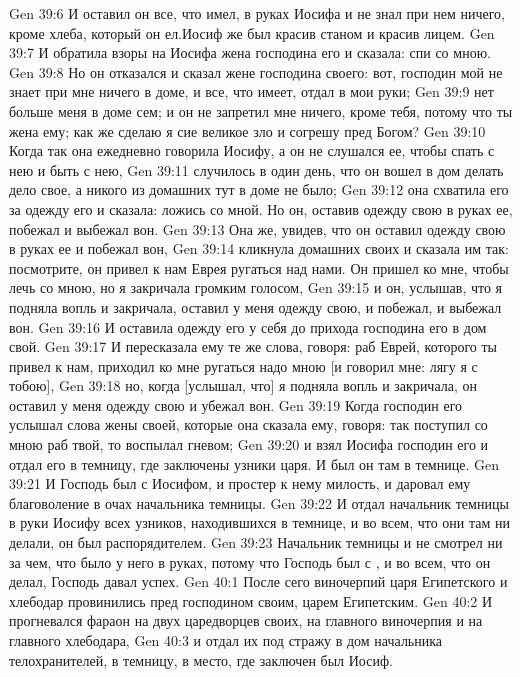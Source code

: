 \vs Gen 39:6 И оставил он все, что имел, в руках Иосифа и не знал при нем ничего, кроме хлеба, который он ел.\rsbpar Иосиф же был красив станом и красив лицем.
\vs Gen 39:7 И обратила взоры на Иосифа жена господина его и сказала: спи со мною.
\vs Gen 39:8 Но он отказался и сказал жене господина своего: вот, господин мой не знает при мне ничего в доме, и все, что имеет, отдал в мои руки;
\vs Gen 39:9 нет больше меня в доме сем; и он не запретил мне ничего, кроме тебя, потому что ты жена ему; как же сделаю я сие великое зло и согрешу пред Богом?
\vs Gen 39:10 Когда так она ежедневно говорила Иосифу, а он не слушался ее, чтобы спать с нею и быть с нею,
\vs Gen 39:11 случилось в один день, что он вошел в дом делать дело свое, а никого из домашних тут в доме не было;
\vs Gen 39:12 она схватила его за одежду его и сказала: ложись со мной. Но он, оставив одежду свою в руках ее, побежал и выбежал вон.
\vs Gen 39:13 Она же, увидев, что он оставил одежду свою в руках ее и побежал вон,
\vs Gen 39:14 кликнула домашних своих и сказала им так: посмотрите, он привел к нам Еврея ругаться над нами. Он пришел ко мне, чтобы лечь со мною, но я закричала громким голосом,
\vs Gen 39:15 и он, услышав, что я подняла вопль и закричала, оставил у меня одежду свою, и побежал, и выбежал вон.
\vs Gen 39:16 И оставила одежду его у себя до прихода господина его в дом свой.
\vs Gen 39:17 И пересказала ему те же слова, говоря: раб Еврей, которого ты привел к нам, приходил ко мне ругаться надо мною [и говорил мне: лягу я с тобою],
\vs Gen 39:18 но, когда [услышал, что] я подняла вопль и закричала, он оставил у меня одежду свою и убежал вон.
\vs Gen 39:19 Когда господин его услышал слова жены своей, которые она сказала ему, говоря: так поступил со мною раб твой, то воспылал гневом;
\vs Gen 39:20 и взял Иосифа господин его и отдал его в темницу, где заключены узники царя. И был он там в темнице.
\rsbpar\vs Gen 39:21 И Господь был с Иосифом, и простер к нему милость, и даровал ему благоволение в очах начальника темницы.
\vs Gen 39:22 И отдал начальник темницы в руки Иосифу всех узников, находившихся в темнице, и во всем, что они там ни делали, он был распорядителем.
\vs Gen 39:23 Начальник темницы и не смотрел ни за чем, что было у него в руках, потому что Господь был с , и во всем, что он делал, Господь давал успех.
\vs Gen 40:1 После сего виночерпий царя Египетского и хлебодар провинились пред господином своим, царем Египетским.
\vs Gen 40:2 И прогневался фараон на двух царедворцев своих, на главного виночерпия и на главного хлебодара,
\vs Gen 40:3 и отдал их под стражу в дом начальника телохранителей, в темницу, в место, где заключен был Иосиф.
